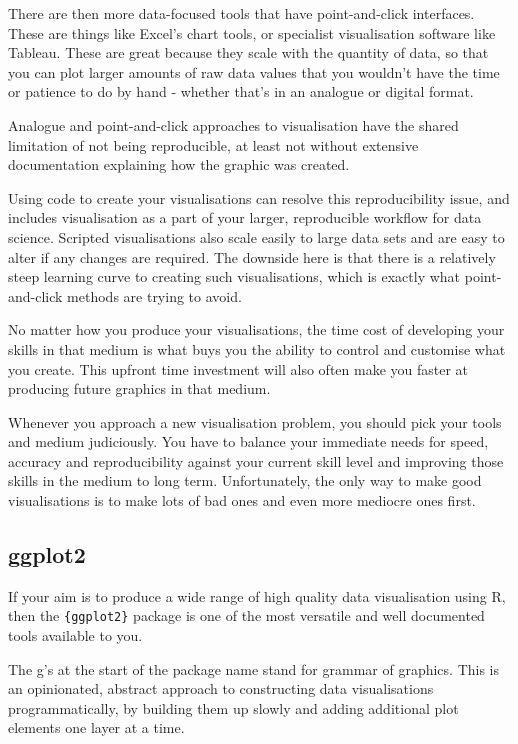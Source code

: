 \documentclass[
  12pt,
]{book}
\begin{document}
There are then more data-focused tools that have point-and-click interfaces. These are things like Excel's chart tools, or specialist visualisation software like Tableau. These are great because they scale with the quantity of data, so that you can plot larger amounts of raw data values that you wouldn't have the time or patience to do by hand - whether that's in an analogue or digital format.

Analogue and point-and-click approaches to visualisation have the shared limitation of not being reproducible, at least not without extensive documentation explaining how the graphic was created.

Using code to create your visualisations can resolve this reproducibility issue, and includes visualisation as a part of your larger, reproducible workflow for data science. Scripted visualisations also scale easily to large data sets and are easy to alter if any changes are required. The downside here is that there is a relatively steep learning curve to creating such visualisations, which is exactly what point-and-click methods are trying to avoid.

No matter how you produce your visualisations, the time cost of developing your skills in that medium is what buys you the ability to control and customise what you create. This upfront time investment will also often make you faster at producing future graphics in that medium.

Whenever you approach a new visualisation problem, you should pick your tools and medium judiciously. You have to balance your immediate needs for speed, accuracy and reproducibility against your current skill level and improving those skills in the medium to long term. Unfortunately, the only way to make good visualisations is to make lots of bad ones and even more mediocre ones first.

\hypertarget{ggplot2}{%
\subsection{ggplot2}\label{ggplot2}}

If your aim is to produce a wide range of high quality data visualisation using R, then the \texttt{\{ggplot2\}} package is one of the most versatile and well documented tools available to you.

The g's at the start of the package name stand for grammar of graphics. This is an opinionated, abstract approach to constructing data visualisations programmatically, by building them up slowly and adding additional plot elements one layer at a time.
\end{document}
